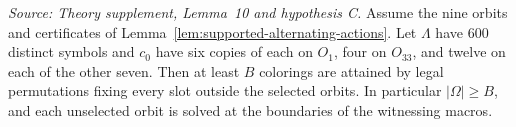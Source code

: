 \begin{lemma}
  \label{lem:balanced-color-lower-bound}
  \leanok
  \textit{Source: Theory supplement, Lemma~10 and hypothesis C.}
  Assume the nine orbits and certificates of
  Lemma~\ref{lem:supported-alternating-actions}. Let \(\Lambda\) have
  \(600\) distinct symbols and \(c_0\) have six copies of each on
  \(O_1\), four on \(O_{33}\), and twelve on each of the other seven.
  Then at least \(B\) colorings are attained by legal permutations
  fixing every slot outside the selected orbits. In particular
  \(|\Omega|\ge B\), and each unselected orbit is solved at the
  boundaries of the witnessing macros.
\end{lemma}
